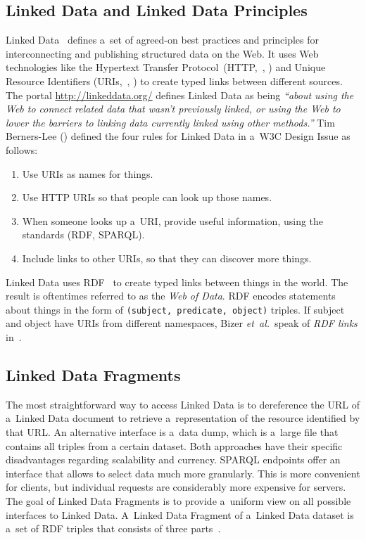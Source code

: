 \documentclass[letterpaper]{article}
\newcommand\citep[1]{\citeauthor{#1}, \citeyear{#1}}
\begin{document}
\subsection{Linked Data and Linked Data Principles}

Linked Data~\cite{bernerslee2006linkeddata}
defines a~set of agreed-on best practices and
principles for interconnecting and publishing
structured data on the Web.
It uses Web technologies like the Hypertext Transfer Protocol~(HTTP,~\citep{fielding1999http})
and Unique Resource Identifiers (URIs,~\citep{bernerslee2005uri})
to create typed links between different sources.
The portal \url{http://linkeddata.org/}
defines Linked Data as being
\textit{``about using the Web to connect related data that
wasn't previously linked, or using the Web
to lower the barriers to linking data
currently linked using other methods.''}
Tim Berners-Lee (\citeyear{bernerslee2006linkeddata}) defined the four rules for Linked Data in a~W3C Design Issue as follows:

\begin{enumerate}
  \item Use URIs as names for things.
  \item Use HTTP URIs so that people can look up those names.
  \item When someone looks up a~URI, provide useful information,
        using the standards (RDF, SPARQL).
  \item Include links to other URIs,
        so that they can discover more things.
\end{enumerate}

Linked Data uses RDF~\cite{klyne2004rdf} to create
typed links between things in the world.
The result is oftentimes referred to as the \emph{Web of Data}.
RDF encodes statements about things in the form of
\texttt{(subject, predicate, object)} triples.
If subject and object have URIs from different namespaces,
Bizer \emph{et~al.}\ speak of \emph{RDF links}
in~\cite{heath2011linkeddata}.

\subsection{Linked Data Fragments}
The most straightforward way to access Linked Data
is to dereference the URL of a~Linked Data document
to retrieve a~representation of the resource identified by that URL.
An alternative interface is a~data dump,
which is a~large file that contains all triples from a certain dataset.
Both approaches have their specific disadvantages regarding scalability and currency.
SPARQL endpoints offer an interface that allows to select data much more granularly.
This is more convenient for clients, but individual requests
are considerably more expensive for servers.
The goal of Linked Data Fragments is to provide a~uniform view
on all possible interfaces to Linked Data.
A~Linked Data Fragment of a~Linked Data dataset is a~set of RDF triples
that consists of three parts~\cite{verborgh2014ldf,verborgh2014ldfiswc}.
\end{document}
